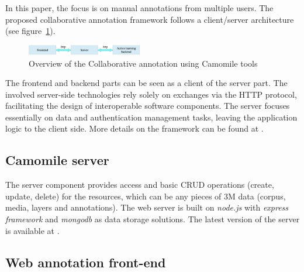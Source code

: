 \documentclass[a4paper]{article}
\begin{document}
In this paper, the focus is on manual annotations from multiple users. The proposed collaborative annotation framework follows a client/server architecture (see figure~\ref{fig:overview}). 

\begin{figure}[h]
 	\includegraphics[width=0.45\textwidth]{overview.png}
	\caption{Overview of the Collaborative annotation using Camomile tools}
	\label{fig:overview}
\end{figure}

The frontend and backend parts can be seen as a client of the server part. The involved server-side technologies rely solely on exchanges via the HTTP protocol, facilitating the design of interoperable software components. The server focuses essentially on data and authentication management tasks, leaving the application logic to the client side. More details on the framework can be found at \cite{urlframework}.


      \subsection{Camomile server}

The server component provides access and basic CRUD operations (create, update, delete) for the resources, which can be any pieces of 3M data (corpus, media, layers and annotations). The web server is built on \textit{node.js} with \textit{express framework} and \textit{mongodb} as data storage solutions. The latest version of the server is available at \cite{urlserver}. 

        \vspace{-0.3cm}
      \subsection{Web annotation front-end}
        \vspace{-0.5cm}
\end{document}

